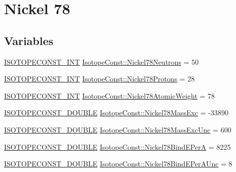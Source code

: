 \hypertarget{group___isotope_const-_nickel-_ni78}{}\section{Nickel 78}
\label{group___isotope_const-_nickel-_ni78}
\subsection*{Variables}
\begin{DoxyCompactItemize}
\item 
\mbox{\hyperlink{group___isotope_const-_macros_ga5f18360b3e99483a35c32d789e62621c}{I\+S\+O\+T\+O\+P\+E\+C\+O\+N\+S\+T\+\_\+\+I\+NT}} \mbox{\hyperlink{group___isotope_const-_nickel-_ni78_gae19d356ee40909258acacac74939f230}{Isotope\+Const\+::\+Nickel78\+Neutrons}} = 50
\item 
\mbox{\hyperlink{group___isotope_const-_macros_ga5f18360b3e99483a35c32d789e62621c}{I\+S\+O\+T\+O\+P\+E\+C\+O\+N\+S\+T\+\_\+\+I\+NT}} \mbox{\hyperlink{group___isotope_const-_nickel-_ni78_ga709f13cf0d38096035fb73ae944dbaae}{Isotope\+Const\+::\+Nickel78\+Protons}} = 28
\item 
\mbox{\hyperlink{group___isotope_const-_macros_ga5f18360b3e99483a35c32d789e62621c}{I\+S\+O\+T\+O\+P\+E\+C\+O\+N\+S\+T\+\_\+\+I\+NT}} \mbox{\hyperlink{group___isotope_const-_nickel-_ni78_gab95e5ca62ac3a59804779cb2b0f2e9b4}{Isotope\+Const\+::\+Nickel78\+Atomic\+Weight}} = 78
\item 
\mbox{\hyperlink{group___isotope_const-_macros_ga8f45a7272ce02c0b4c65c44636ed719a}{I\+S\+O\+T\+O\+P\+E\+C\+O\+N\+S\+T\+\_\+\+D\+O\+U\+B\+LE}} \mbox{\hyperlink{group___isotope_const-_nickel-_ni78_gac82f7a3aa11893659454182c42c65b58}{Isotope\+Const\+::\+Nickel78\+Mass\+Exc}} = -\/33890
\item 
\mbox{\hyperlink{group___isotope_const-_macros_ga8f45a7272ce02c0b4c65c44636ed719a}{I\+S\+O\+T\+O\+P\+E\+C\+O\+N\+S\+T\+\_\+\+D\+O\+U\+B\+LE}} \mbox{\hyperlink{group___isotope_const-_nickel-_ni78_ga93ab393195a3d96587290bedb4c25361}{Isotope\+Const\+::\+Nickel78\+Mass\+Exc\+Unc}} = 600
\item 
\mbox{\hyperlink{group___isotope_const-_macros_ga8f45a7272ce02c0b4c65c44636ed719a}{I\+S\+O\+T\+O\+P\+E\+C\+O\+N\+S\+T\+\_\+\+D\+O\+U\+B\+LE}} \mbox{\hyperlink{group___isotope_const-_nickel-_ni78_ga355d422ca22aff4322ee5164b489ac9e}{Isotope\+Const\+::\+Nickel78\+Bind\+E\+PerA}} = 8225
\item 
\mbox{\hyperlink{group___isotope_const-_macros_ga8f45a7272ce02c0b4c65c44636ed719a}{I\+S\+O\+T\+O\+P\+E\+C\+O\+N\+S\+T\+\_\+\+D\+O\+U\+B\+LE}} \mbox{\hyperlink{group___isotope_const-_nickel-_ni78_gabc84fa8cdf6d30e17756256ac9787bc7}{Isotope\+Const\+::\+Nickel78\+Bind\+E\+Per\+A\+Unc}} = 8

\end{DoxyCompactItemize}
